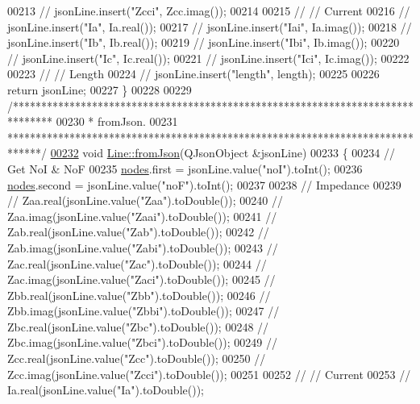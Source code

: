 \begin{DoxyCode}
00213 \textcolor{comment}{//  jsonLine.insert("Zcci", Zcc.imag());}
00214 
00215 \textcolor{comment}{//  // Current}
00216 \textcolor{comment}{//  jsonLine.insert("Ia", Ia.real());}
00217 \textcolor{comment}{//  jsonLine.insert("Iai", Ia.imag());}
00218 \textcolor{comment}{//  jsonLine.insert("Ib", Ib.real());}
00219 \textcolor{comment}{//  jsonLine.insert("Ibi", Ib.imag());}
00220 \textcolor{comment}{//  jsonLine.insert("Ic", Ic.real());}
00221 \textcolor{comment}{//  jsonLine.insert("Ici", Ic.imag());}
00222 
00223 \textcolor{comment}{//  // Length}
00224 \textcolor{comment}{//  jsonLine.insert("length", length);}
00225 
00226   \textcolor{keywordflow}{return} jsonLine;
00227 \}
00228 
00229 \textcolor{comment}{/*******************************************************************************}
00230 \textcolor{comment}{ * fromJson.}
00231 \textcolor{comment}{ ******************************************************************************/}
\hypertarget{line_8cpp_source_l00232}{}\hyperlink{group___models_ga62623ad71df5279377cc69da90decc75}{00232} \textcolor{keywordtype}{void} \hyperlink{group___models_ga62623ad71df5279377cc69da90decc75}{Line::fromJson}(QJsonObject &jsonLine)
00233 \{
00234   \textcolor{comment}{// Get NoI & NoF}
00235   \hyperlink{class_line_afd17c40d656e6a8d677cb22df5f0c70b}{nodes}.first = jsonLine.value(\textcolor{stringliteral}{"noI"}).toInt();
00236   \hyperlink{class_line_afd17c40d656e6a8d677cb22df5f0c70b}{nodes}.second = jsonLine.value(\textcolor{stringliteral}{"noF"}).toInt();
00237 
00238   \textcolor{comment}{// Impedance}
00239 \textcolor{comment}{//  Zaa.real(jsonLine.value("Zaa").toDouble());}
00240 \textcolor{comment}{//  Zaa.imag(jsonLine.value("Zaai").toDouble());}
00241 \textcolor{comment}{//  Zab.real(jsonLine.value("Zab").toDouble());}
00242 \textcolor{comment}{//  Zab.imag(jsonLine.value("Zabi").toDouble());}
00243 \textcolor{comment}{//  Zac.real(jsonLine.value("Zac").toDouble());}
00244 \textcolor{comment}{//  Zac.imag(jsonLine.value("Zaci").toDouble());}
00245 \textcolor{comment}{//  Zbb.real(jsonLine.value("Zbb").toDouble());}
00246 \textcolor{comment}{//  Zbb.imag(jsonLine.value("Zbbi").toDouble());}
00247 \textcolor{comment}{//  Zbc.real(jsonLine.value("Zbc").toDouble());}
00248 \textcolor{comment}{//  Zbc.imag(jsonLine.value("Zbci").toDouble());}
00249 \textcolor{comment}{//  Zcc.real(jsonLine.value("Zcc").toDouble());}
00250 \textcolor{comment}{//  Zcc.imag(jsonLine.value("Zcci").toDouble());}
00251 
00252 \textcolor{comment}{//  // Current}
00253 \textcolor{comment}{//  Ia.real(jsonLine.value("Ia").toDouble());}

\end{DoxyCode}
